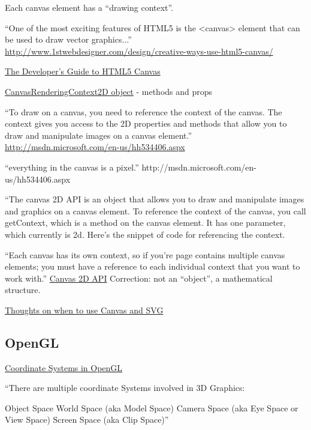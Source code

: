 \documentclass[12pt]{tufte-handout}
\numberwithin{equation}{subsection}
\numberwithin{equation}{subsection}
\begin{document}
{\begin{appendices}
    Each canvas element has a ``drawing context''.

    ``One of the most exciting features of HTML5 is the <canvas> element that can be used to draw vector graphics...'' \url{http://www.1stwebdesigner.com/design/creative-ways-use-html5-canvas/}


    \href{http://msdn.microsoft.com/en-us/hh534406.aspx}{The Developer’s Guide to HTML5 Canvas}

    \href{http://msdn.microsoft.com/en-us/library/ff975057.aspx}{CanvasRenderingContext2D object} - methods and props

    ``To draw on a canvas, you need to reference the context of the canvas.  The context gives you access to the 2D properties and methods that allow you to draw and manipulate images on a canvas element.'' \url{http://msdn.microsoft.com/en-us/hh534406.aspx}

    ``everything in the canvas is a pixel.'' http://msdn.microsoft.com/en-us/hh534406.aspx

    ``The canvas 2D API is an object that allows you to draw and
    manipulate images and graphics on a canvas element.  To reference the context of the canvas, you call getContext, which is a method on the canvas element.  It has one parameter, which currently is 2d.  Here’s the snippet of code for referencing the context.

    ``Each canvas has its own context, so if you’re page contains multiple canvas elements; you must have a reference to each individual context that you want to work with.'' \url{Canvas 2D
      API}  Correction: not an ``object'', a mathematical structure.

    \href{http://blogs.msdn.com/b/ie/archive/2011/04/22/thoughts-on-when-to-use-canvas-and-svg.aspx}{Thoughts on when to use Canvas and SVG}

    \subsection{OpenGL}
    \label{subs:opengl}


    \href{http://www.matrix44.net/cms/notes/opengl-3d-graphics/coordinate-systems-in-opengl}{Coordinate Systems in OpenGL}

    ``There are multiple coordinate Systems involved in 3D Graphics:

    Object Space
    World Space (aka Model Space)
    Camera Space (aka Eye Space or View Space)
    Screen Space (aka Clip Space)''


\end{appendices}}
\end{document}
